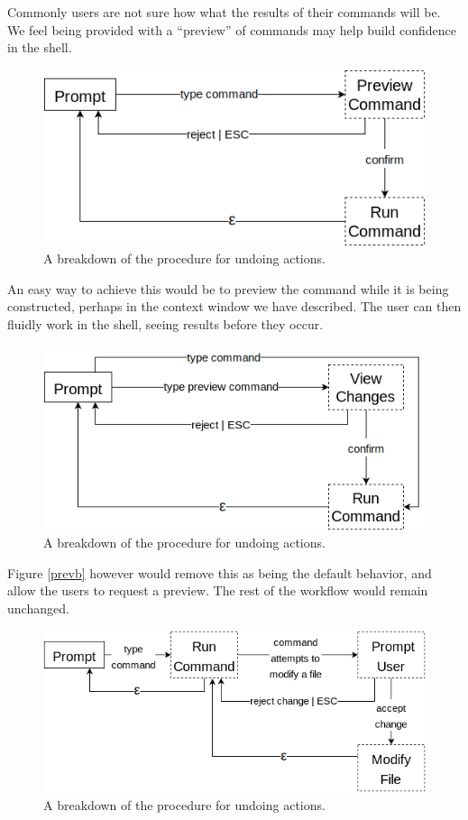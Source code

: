 Commonly users are not sure how what the results of their commands will be. We
feel being provided with a ``preview'' of commands may help build confidence in
the shell.

\begin{figure}[H]
  \centering
  \includegraphics[width=0.8\linewidth]{figures/alternatives/preview_a.png}
  \caption{A breakdown of the procedure for undoing actions.}
  \label{fig:preva}
\end{figure}

An easy way to achieve this would be to preview the command while it is being
constructed, perhaps in the context window we have described. The user can then
fluidly work in the shell, seeing results before they occur.

\begin{figure}[H]
  \centering
  \includegraphics[width=0.8\linewidth]{figures/alternatives/preview_b.png}
  \caption{A breakdown of the procedure for undoing actions.}
  \label{fig:prevb}
\end{figure}

Figure \ref{prevb} however would remove this as being the default behavior, and
allow the users to request a preview. The rest of the workflow would remain
unchanged.

\begin{figure}[H]
  \centering
  \includegraphics[width=0.8\linewidth]{figures/alternatives/preview_c.png}
  \caption{A breakdown of the procedure for undoing actions.}
  \label{fig:prevc}
\end{figure}

